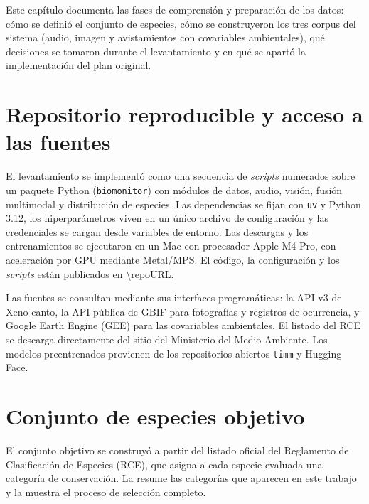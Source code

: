 
Este capítulo documenta las fases de comprensión y preparación de los datos:
cómo se definió el conjunto de especies, cómo se construyeron los tres corpus
del sistema (audio, imagen y avistamientos con covariables ambientales), qué
decisiones se tomaron durante el levantamiento y en qué se apartó la
implementación del plan original.

\section{Repositorio reproducible y acceso a las fuentes}\label{sec:repositorio}

El levantamiento se implementó como una secuencia de \textit{scripts}
numerados sobre un paquete Python (\texttt{biomonitor}) con módulos de
datos, audio, visión, fusión multimodal y distribución de especies. Las
dependencias se fijan con \texttt{uv} y Python 3.12, los hiperparámetros
viven en un único archivo de configuración y las credenciales se cargan
desde variables de entorno. Las descargas y los entrenamientos se ejecutaron
en un Mac con procesador Apple M4 Pro, con aceleración por GPU mediante
Metal/MPS. El código, la configuración y los \textit{scripts} están
publicados en \url{\repoURL}.

Las fuentes se consultan mediante sus interfaces programáticas: la API v3 de
Xeno-canto, la API pública de GBIF para fotografías y registros de
ocurrencia, y Google Earth Engine (GEE) para las covariables ambientales. El
listado del RCE se descarga directamente del sitio del Ministerio del Medio
Ambiente. Los modelos preentrenados provienen de los repositorios abiertos
\texttt{timm} y Hugging Face.

\section{Conjunto de especies objetivo}\label{sec:especies}

El conjunto objetivo se construyó a partir del listado oficial del
Reglamento de Clasificación de Especies (RCE), que asigna a cada especie
evaluada una categoría de conservación. La  resume las
categorías que aparecen en este trabajo y la  muestra
el proceso de selección completo.

